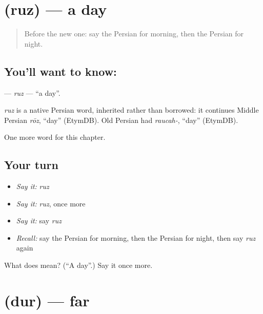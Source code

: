\section[\texorpdfstring{\fa{روز} (ruz)}{روز (ruz)}]{ (ruz) — a day}

\label{lesson:FA-C67-ruz}



\begin{quote}
Before the new one: say the Persian for morning, then the Persian for night.
\end{quote}

\subsection*{You'll want to know: }
\textbf{} — \emph{ruz} — \textquotedblleft{}a day\textquotedblright{}.

\begin{cousinweb}
\emph{ruz} is a native Persian word, inherited rather than borrowed: it continues Middle Persian \emph{rōz}, \textquotedblleft{}day\textquotedblright{} (EtymDB). Old Persian had \emph{raucah-}, \textquotedblleft{}day\textquotedblright{} (EtymDB).
\end{cousinweb}

\begin{grammarlens}[title={What you've built}]
One more word for this chapter.
\end{grammarlens}

\subsection*{Your turn}
\begin{itemize}
\raggedright
  \item \emph{Say it:} \emph{ruz}
  \item \emph{Say it:} \emph{ruz}, once more
  \item \emph{Say it:} say \emph{ruz}
  \item \emph{Recall:} say the Persian for morning, then the Persian for night, then say \emph{ruz} again
\end{itemize}

\begin{tcolorbox}[breakable,colback=teal!4,colframe=teal!35!black,title={Before you move on}]
What does  mean? (\textquotedblleft{}A day\textquotedblright{}.) Say it once more.
\end{tcolorbox}
\section[\texorpdfstring{\fa{دور} (dur)}{دور (dur)}]{ (dur) — far}

